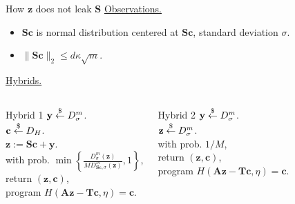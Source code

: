 \begin{frame}{How $\mathbf{z}$ does not leak $\mathbf{S}$}
	\underline{Observations.}
	\begin{itemize}
		\item $\mathbf{S}\mathbf{c}$ is normal distribution centered at $\mathbf{S}\mathbf{c}$, standard deviation $\sigma$.
		\item $\lVert\mathbf{S}\mathbf{c}\rVert_2 \leq d\kappa \sqrt{m}$.
	\end{itemize}
	
	\underline{Hybrids.}
	\begin{columns}[c]
		\begin{expt}{Hybrid 1}
			$\mathbf{y} \stackrel{\$}{\leftarrow} D_\sigma^m$.\\
			$\mathbf{c} \stackrel{\$}{\leftarrow} D_H$.\\
			$\mathbf{z} := \mathbf{S}\mathbf{c} + \mathbf{y}$.\\
			with prob. $\min\left\{\frac{D^m_\sigma(\mathbf{z})}{MD^m_{\mathbf{S}\mathbf{c},\sigma}(\mathbf{z})},1\right\}$,\\
			\qquad return $(\mathbf{z}, \mathbf{c})$, \\
			\qquad program $H(\mathbf{A}\mathbf{z} - \mathbf{T}\mathbf{c}, \eta) = \mathbf{c}$.\\
		\end{expt}
		\begin{expt}{Hybrid 2}
			$\mathbf{y} \stackrel{\$}{\leftarrow} D_\sigma^m$.\\
			$\mathbf{z} \stackrel{\$}{\leftarrow} D_\sigma^m$.\\
			with prob. $1/M$,\\
			\qquad return $(\mathbf{z}, \mathbf{c})$, \\
			\qquad program $H(\mathbf{A}\mathbf{z} - \mathbf{T}\mathbf{c}, \eta) = \mathbf{c}$.\\
		\end{expt}
	\end{columns}
\end{frame}